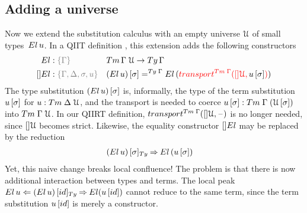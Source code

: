 \documentclass[a4paper,UKenglish,numberwithinsect,cleveref,thm-restate]{lipics-v2021}
\begin{document}
\subsection{Adding a universe} \label{subsec:SC+U}
Now we extend the substitution calculus with an empty universe $\mathcal{U}$ of small types~$\El\,u$.
In a QIIT definition \cite{Altenkirch2016a}, this extension adds the following constructors
\begin{alignat*}{3}
  \El   & : \implicit{\Gamma} && \Tm\,\Gamma\;\UU \to \Ty\,\Gamma \\
  []\El & : \implicit{\Gamma, \Delta, \sigma, u} && \sub{(\El\, u)}{\sigma} =^{\Ty\;\Gamma} \El\,(\alert{\transfib{\Tm\;\Gamma}{[]\UU}{\color{black}\sub{u}{\sigma}}})
\end{alignat*}
The type substitution $\sub{(\El\,u)}{\sigma}$ is, informally, the type of the term substitution ${u}\,[\sigma]$ for $u : \Tm\;\Delta\;\UU$, and the transport is needed to coerce $\sub{u}{\sigma} : \Tm\;\Gamma\;(\sub{\UU}{\sigma})$ into $\Tm\;\Gamma\;\UU$.
%
In our QIIRT definition, $\transfib{\Tm\;\Gamma}{[]\UU}{\blank}$ is no longer needed, since $[]\mathcal{U}$ becomes strict. 
Likewise, the equality constructor $[]\El$ may be replaced by the reduction
\begin{alignat*}{3}
  \subTy{(\El\, u)}{\sigma} & \reduce \El\,(\sub{u}{\sigma})
\end{alignat*}
Yet, this naive change breaks local confluence!
The problem is that there is now additional interaction between types and terms.
The local peak
\(
  \El\,u \Leftarrow \subTy{(\El\,u)}{\idS} \reduce \El(\sub{u}{\idS})
\)
cannot reduce to the same term, since the term substitution $\sub{u}{\idS}$ is merely a constructor.
%
\end{document}
